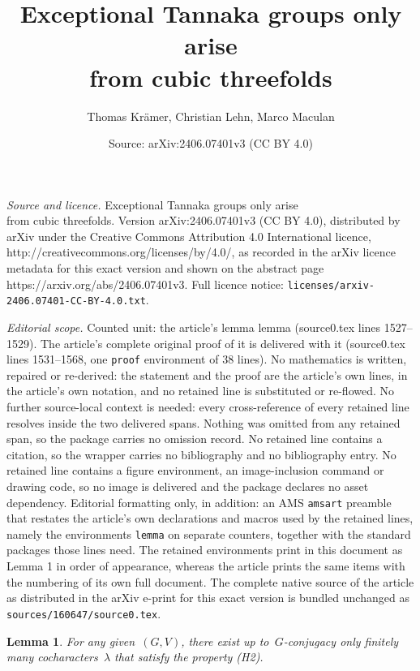 \documentclass[10pt,a4paper]{amsart}
\title{Exceptional Tannaka groups only arise\\ from cubic threefolds}
\author{Thomas Kr\"amer, Christian Lehn, Marco Maculan}
\date{Source: arXiv:2406.07401v3 (CC BY 4.0)}
\newtheorem{lemma}{Lemma}
\begin{document}
\maketitle

\noindent\emph{Source and licence.} Exceptional Tannaka groups only arise\\ from cubic threefolds. Version arXiv:2406.07401v3 (CC BY 4.0), distributed by arXiv under the Creative Commons Attribution 4.0 International licence, http://creativecommons.org/licenses/by/4.0/, as recorded in the arXiv licence metadata for this exact version and shown on the abstract page https://arxiv.org/abs/2406.07401v3. Full licence notice: \texttt{licenses/arxiv-2406.07401-CC-BY-4.0.txt}.\par\smallskip

\noindent\textit{Editorial scope.} Counted unit: the article's lemma lemma (source0.tex lines 1527--1529). The article's complete original proof of it is delivered with it (source0.tex lines 1531--1568, one \texttt{proof} environment of 38 lines). No mathematics is written, repaired or re-derived: the statement and the proof are the article's own lines, in the article's own notation, and no retained line is substituted or re-flowed.  No further source-local context is needed: every cross-reference of every retained line resolves inside the two delivered spans.  Nothing was omitted from any retained span, so the package carries no omission record.  No retained line contains a citation, so the wrapper carries no bibliography and no bibliography entry.  No retained line contains a figure environment, an image-inclusion command or drawing code, so no image is delivered and the package declares no asset dependency.  Editorial formatting only, in addition: an AMS \texttt{amsart} preamble that restates the article's own declarations and macros used by the retained lines, namely the environments \texttt{lemma} on separate counters, together with the standard packages those lines need.  The retained environments print in this document as Lemma 1 in order of appearance, whereas the article prints the same items with the numbering of its own full document.  The complete native source of the article as distributed in the arXiv e-print for this exact version is bundled unchanged as \texttt{sources/160647/source0.tex}.
\begin{lemma}
For any given~$(G, V)$, there exist up to~$G$-conjugacy only finitely many cocharacters~$\lambda$ that satisfy the property (H2). 
\end{lemma} 
\end{document}
